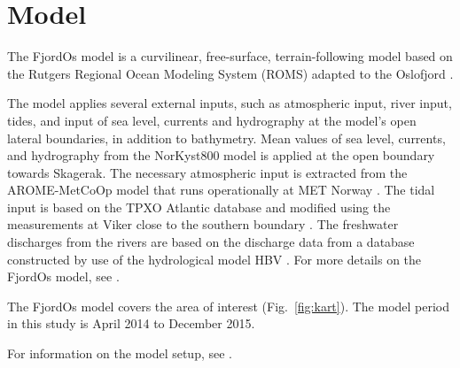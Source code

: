 \section{Model}

The FjordOs model is a curvilinear, free-surface, terrain-following model based on the Rutgers Regional Ocean Modeling System (ROMS) \citep{haidv:etal:2008,shche:mcwil:2003,shche:mcwil:2005,shche:mcwil:2009} adapted to the Oslofjord \citep{roed:etal:2016}. 

The model applies several external inputs, such as atmospheric input, river input, tides, and input of sea level, currents and hydrography at the model's open lateral boundaries, in addition to bathymetry. Mean values of sea level, currents, and hydrography from the NorKyst800 model \citep{albre:etal:2011} is applied at the open boundary towards Skagerak. The necessary atmospheric input is extracted from the AROME-MetCoOp model that runs operationally at MET Norway \citep{mulle:etal:2015}. The tidal input is based on the TPXO Atlantic database \citep{egber:erofe:2002} and modified using the measurements at Viker close to the southern boundary \cite[]{hjelmervik:etal:2017}. The freshwater discharges from the rivers are based on the discharge data from a database constructed by use of the hydrological model HBV \citep{beldr:etal:2003}. For more details on the FjordOs model, see \cite{roed:etal:2016}.

The FjordOs model covers the area of interest (Fig.~\ref{fig:kart}). The model period in this study is April 2014 to December 2015.

For information on the model setup, see \cite[]{roed:etal:2015}.


\newpage
